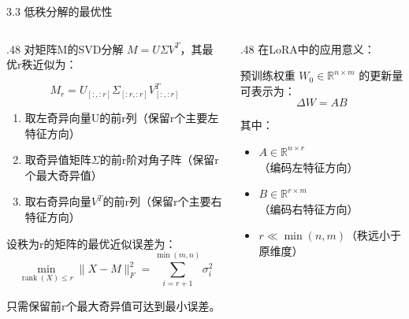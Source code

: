 \documentclass[aspectratio=169,10pt]{beamer}
\begin{document}
\begin{frame}[fragile,shrink=12]{3.3 低秩分解的最优性}
\footnotesize
\begin{columns}[T,onlytextwidth]
  \begin{column}{.48\textwidth}
    对矩阵M的SVD分解 \(M = U\Sigma V^T\)，其最优r秩近似为：
    
    \[M_r = U_{[:,:r]} \Sigma_{[:r,:r]} V^T_{[:,:r]}\]
    
    \begin{enumerate}
    \def\labelenumi{\arabic{enumi}.}
    \item
      取左奇异向量U的前r列（保留r个主要左特征方向）
    \item
      取奇异值矩阵\(\Sigma\)的前r阶对角子阵（保留r个最大奇异值）
    \item
      取右奇异向量\(V^T\)的前r列（保留r个主要右特征方向）
    \end{enumerate}
    
    设秩为r的矩阵的最优近似误差为： \[\min_{\operatorname{rank}(X)\leq r} \|X - M\|_F^2 = \sum_{i=r+1}^{\min(m,n)} \sigma_i^2\]
    
    只需保留前r个最大奇异值可达到最小误差。
  \end{column}
  \begin{column}{.48\textwidth}
    \alert{在LoRA中的应用意义：}
    
    预训练权重 \(W_0 \in \mathbb{R}^{n \times m}\) 的更新量可表示为： \[\Delta W = AB\]
    
    其中：
\begin{itemize}
\item \(A \in \mathbb{R}^{n \times r}\)（编码左特征方向）
\item \(B \in \mathbb{R}^{r \times m}\)（编码右特征方向）
\item \(r \ll \min(n,m)\)（秩远小于原维度）
\end{itemize}
  \end{column}
\end{columns}
\end{frame}

\end{document}
